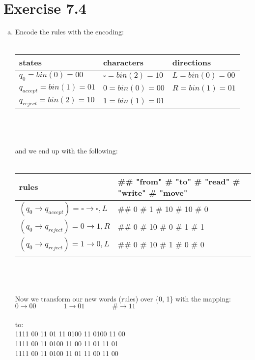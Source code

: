 \documentclass{article} %
\newcommand{\homeworkNumber}{7}
\begin{document}
\section*{Exercise \homeworkNumber.4}
\begin{enumerate}[(a)]
\item
Encode the rules with the encoding:\\\\

\begin{tabular}{ l | l | l }
states & characters & directions\\
\hline
$ q_0 = bin(0) = 00 $ & $ \square = bin(2) = 10 $ & $ L = bin(0) = 00 $\\
$ q_{accept} = bin(1) = 01 $ & $ 0 = bin(0) = 00 $ & $ R = bin(1) = 01 $\\
$ q_{reject} = bin(2) = 10 $ & $ 1 = bin(1) = 01 $ & \\
\end{tabular}\\\\\\

and we end up with the following:\\\\

\begin{tabular}{ l | l }
rules & \#\# "from" \# "to" \# "read" \# "write" \# "move"\\
\hline
$(q_0 \to q_{accept}) = \square \to \square, L $ & \#\# 0 \# 1 \# 10 \# 10 \# 0\\
$(q_0 \to q_{reject}) = 0 \to 1, R $ & \#\# 0 \# 10 \# 0 \# 1 \# 1\\
$(q_0 \to q_{reject}) = 1 \to 0, L $ & \#\# 0 \# 10 \# 1 \# 0 \# 0\\\\
\end{tabular}\\\\\\ 

Now we transform our new words (rules) over \{0, 1\} with the mapping:\\
$0 \to 00 \qquad \qquad 1 \to 01 \qquad \qquad \# \to 11$\\\\
to:\\
1111 00 11 01 11 0100 11 0100 11 00\\
1111 00 11 0100 11 00 11 01 11 01\\
1111 00 11 0100 11 01 11 00 11 00\\\\


\end{enumerate}
\end{document}
